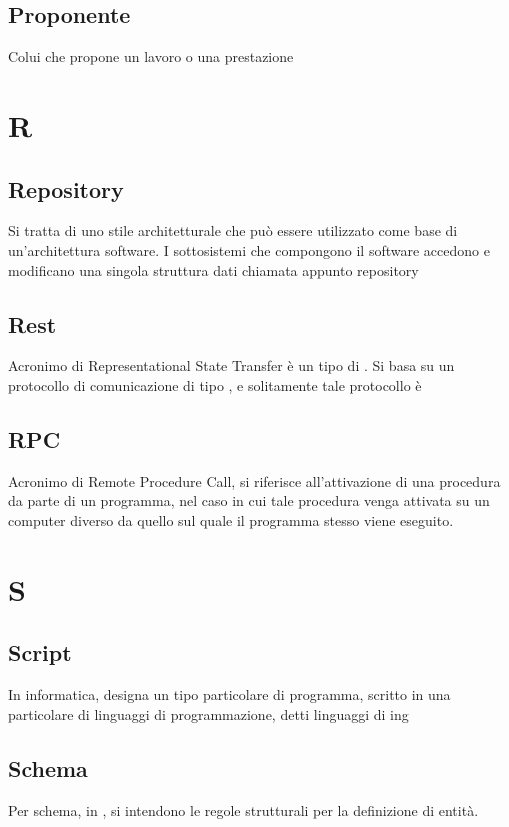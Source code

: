 {{		\subsection{Proponente}
		Colui che propone un lavoro o una prestazione


\section{R}
		\subsection{Repository}
		Si tratta di uno stile architetturale che può essere utilizzato come base di un'architettura software.
I sottosistemi che compongono il software accedono e modificano una singola struttura dati chiamata appunto repository


			\subsection{Rest}
			Acronimo di Representational State Transfer è un tipo di . Si basa su un protocollo di comunicazione  di tipo , e solitamente tale protocollo è 


		\subsection{RPC}
		Acronimo di Remote Procedure Call, si riferisce all'attivazione di una procedura da parte di un programma, nel caso in cui tale procedura venga attivata su un computer diverso da quello sul quale il programma stesso viene eseguito.

\section{S}
		\subsection{Script}
		In informatica, designa un tipo particolare di programma, scritto in una particolare  di linguaggi di programmazione, detti linguaggi di ing


		\subsection{Schema}
		Per schema, in , si intendono le regole strutturali per la definizione di entità.


}}
